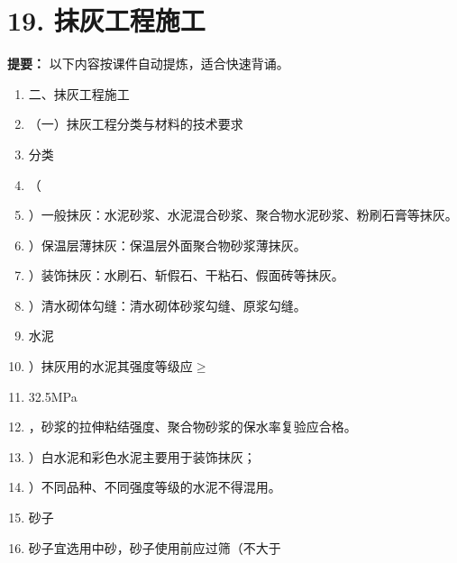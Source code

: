 \documentclass[UTF8,fontset=fandol,11pt]{ctexart}
\begin{document}
\newpage

\section*{19. 抹灰工程施工}


\begin{mainbox}

\textbf{提要：} 以下内容按课件自动提炼，适合快速背诵。

\end{mainbox}

\begin{enumerate}[label=\arabic*.]

\item 二、抹灰工程施工

\item （一）抹灰工程分类与材料的技术要求

\item 分类

\item （

\item ）一般抹灰：水泥砂浆、水泥混合砂浆、聚合物水泥砂浆、粉刷石膏等抹灰。

\item ）保温层薄抹灰：保温层外面聚合物砂浆薄抹灰。

\item ）装饰抹灰：水刷石、斩假石、干粘石、假面砖等抹灰。

\item ）清水砌体勾缝：清水砌体砂浆勾缝、原浆勾缝。

\item 水泥

\item ）抹灰用的水泥其强度等级应$\geq$

\item 32.5MPa

\item ，砂浆的拉伸粘结强度、聚合物砂浆的保水率复验应合格。

\item ）白水泥和彩色水泥主要用于装饰抹灰；

\item ）不同品种、不同强度等级的水泥不得混用。

\item 砂子

\item 砂子宜选用中砂，砂子使用前应过筛（不大于


\end{enumerate}
\end{document}
